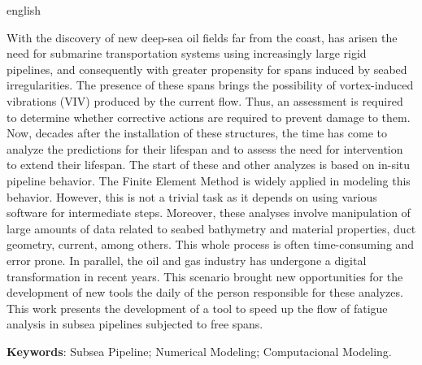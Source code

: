 \begin{resumo}[Abstract]
    \begin{otherlanguage*}{english}
    
    With the discovery of new deep-sea oil fields far from the coast, has arisen the need for submarine transportation systems using increasingly large rigid pipelines, and consequently with greater propensity for spans induced by seabed irregularities.
    The presence of these spans brings the possibility of vortex-induced vibrations (VIV) produced by the current flow.
    Thus, an assessment is required to determine whether corrective actions are required to prevent damage to them.
    Now, decades after the installation of these structures, the time has come to analyze the predictions for their lifespan and to assess the need for intervention to extend their lifespan.
    The start of these and other analyzes is based on in-situ pipeline behavior.
    The Finite Element Method is widely applied in modeling this behavior.
    However, this is not a trivial task as it depends on using various software for intermediate steps.
    Moreover, these analyses involve manipulation of large amounts of data related to seabed bathymetry and material properties, duct geometry, current, among others.
    This whole process is often time-consuming and error prone.
    In parallel, the oil and gas industry has undergone a digital transformation in recent years.
    This scenario brought new opportunities for the development of new tools the daily of the person responsible for these analyzes.
    This work presents the development of a tool to speed up the flow of fatigue analysis in subsea pipelines subjected to free spans.

    \vspace{\onelineskip}

    \noindent
    \textbf{Keywords}: Subsea Pipeline; Numerical Modeling; Computacional Modeling.
    \end{otherlanguage*}
\end{resumo}